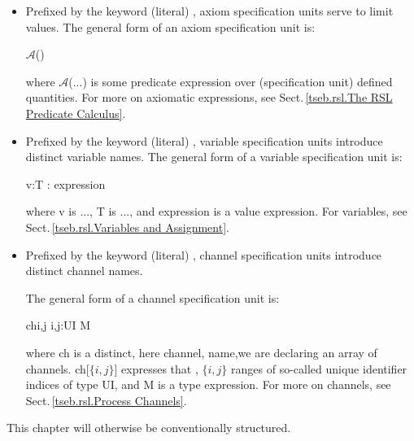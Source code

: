 {\begin{itemize}
\item {} Prefixed by the keyword (literal) , axiom
  specification units  serve to limit values.
  The general form of an axiom specification unit is:

\bp
\>\> $\mathcal{A}$({\DOTDOTDOT})
\ep

\noindent
where \textsf{$\mathcal{A}$(...)} is some predicate expression over
(specification unit) defined quantities.
  For more on axiomatic expressions, see Sect.\,\ref{tseb.rsl.The RSL
  Predicate Calculus}.
  
\item {} Prefixed by the keyword (literal) , variable
  specification units  introduce  distinct variable names.
  The general form of a variable specification unit is:

\bp
\>\> v:T :{\EQ} expression
\ep

\noindent
where \textsf{v} is ..., \textsf{T} is ..., and \textsf{expression} is
  a value expression.
  For variables, see Sect.\,\ref{tseb.rsl.Variables and Assignment}.
  
\item {} Prefixed by the keyword (literal) , channel
  specification units introduce  distinct channel names. 

  The general form of a channel specification unit is:

\bp
\>\> {\LBRACE} ch{\LBRACKET}{\LBRACE}i,j{\RBRACE}{\RBRACKET} {\BAR} i,j:UI {\RDOT} {\DOTDOTDOT} {\RBRACE} M
\ep

\noindent
where \textsf{ch} is a distinct, here channel, name,we are declaring
an array of channels.
\textsf{ch[$\{i,j\}$]} expresses that ,
$\{i,j\}$ ranges of so-called unique identifier indices of type
\textsf{UI}, and \textsf{M} is a type expression.
For more on
  channels, see Sect.\,\ref{tseb.rsl.Process Channels}. 
  
\end{itemize}
\noindent
This chapter will otherwise be conventionally structured.
}%

\label{tseb.rsl.Types}%


